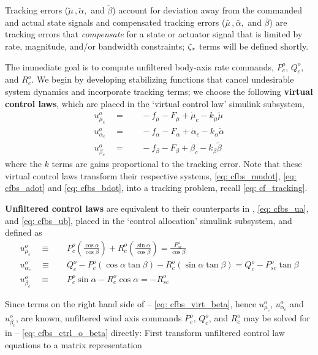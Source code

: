 \documentclass[12pt]{ucthesis}
\begin{document}
\indent Tracking errors ($\tilde{\mu}\,,\tilde{\alpha},$ and $\tilde{\beta}$) account for deviation away from the commanded and actual state signals and compensated tracking errors ($\bar{\mu}\,,\bar{\alpha},$ and $\bar{\beta}$) are tracking errors that \textit{compensate} for a state or actuator signal that is limited by rate, magnitude, and/or bandwidth constraints; $\zeta_x$ terms will be defined shortly.

The immediate goal is to compute unfiltered body-axis rate commands, $P^o_c$, $Q^o_c$, and $R^o_c$. We begin by developing stabilizing functions that cancel undesirable system dynamics and incorporate tracking terms; we choose the following \textbf{virtual control laws}, which are placed in the `virtual control law' simulink subsystem,
	\begin{align}
		\label{eq: cfbs_virt_mu}	u^{o}_{\mu_c} 		\quad =& \quad -f_{\mu} 	- F_{\mu} 		+ \dot{\mu}_c 		- k_{\mu}\tilde{\mu} 			\\
		\label{eq: cfbs_virt_alpha}	u^{o}_{\alpha_c} 	\quad =& \quad -f_{\alpha} 	- F_{\alpha} 	+ \dot{\alpha}_c 	- k_{\alpha}\tilde{\alpha} 	\\
		\label{eq: cfbs_virt_beta}	u^{o}_{\beta_c} 	\quad =& \quad -f_{\beta} 	- F_{\beta} 	+ \dot{\beta}_c 	- k_{\beta}\tilde{\beta}
	\end{align}
where the $k$ terms are gains proportional to the tracking error. Note that these virtual control laws transform their respective systems, \ref{eq: cfbs_mudot}, \ref{eq: cfbs_adot} and \ref{eq: cfbs_bdot}, into a tracking problem, recall \autoref{eq: cf_tracking}.

\textbf{Unfiltered control laws} are equivalent to their counterparts in , \ref{eq: cfbs_ua}, and \ref{eq: cfbs_ub}, placed in the `control allocation' simulink subsystem, and defined as
	\begin{align}
		\label{eq: cfbs_ctrl_o_mu}		u^{o}_{\mu_c} 		\quad \equiv& \quad P^o_c\left(\frac{\cos\alpha}{\cos\beta}\right) + R^o_c\left(\frac{\sin\alpha}{\cos\beta}\right) = \frac{P^o_{sc}}{\cos\beta} \\
		\label{eq: cfbs_ctrl_o_alpha}	u^{o}_{\alpha_c} 	\quad \equiv& \quad Q^o_c -P^o_c(\cos\alpha\tan\beta)  -R^o_c(\sin\alpha\tan\beta) =  Q^o_c - P^o_{sc}\tan\beta \\
		\label{eq: cfbs_ctrl_o_beta}	u^{o}_{\beta_c} 	\quad \equiv& \quad P^o_c \sin\alpha - R^o_c \cos\alpha = -R^o_{sc} 
	\end{align}

Since terms on the right hand side of -- \ref{eq: cfbs_virt_beta}, hence $u^{o}_{\mu_c}$, $u^{o}_{\alpha_c}$ and $u^{o}_{\beta_c}$, are known, unfiltered wind axis commands $P^o_c$, $Q^o_c$, and $R^o_c$ may be solved for in -- \ref{eq: cfbs_ctrl_o_beta} directly: First transform unfiltered control law equations to a matrix representation
\end{document}
